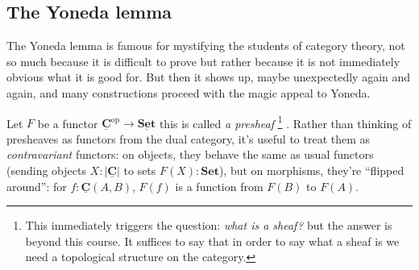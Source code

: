 \documentclass{article}
\newcommand{\Prop}{\mathbf{Prop}}
\newcommand{\Set}{\mathbf{Set}}
\newcommand{\cat}[1]{\underline{\mathbf{#1}}}
\newcommand{\obj}[1]{|#1|}
\newcommand{\op}{\mathrm{op}}
\newcommand{\Nat}{\mathbb{N}}
\begin{document}
\subsection{The Yoneda lemma}
\label{sec:yoneda-lemma}

The Yoneda lemma is famous for mystifying the students of category theory, not so much because it is difficult to prove but rather because it is not immediately obvious what it is good for. But then it shows up, maybe unexpectedly again and again, and many constructions proceed with the magic appeal to Yoneda. 


Let $F$ be a functor $\cat{C}^\op \to \cat{\Set}$ this is called \emph{a presheaf}%
\footnote{This immediately triggers the question: \emph{what is a sheaf?} but the answer is beyond this course. It suffices to say that in order to say what a sheaf is we need a topological structure on the category.}
.
Rather than thinking of presheaves as functors from the dual category, it's useful to
treat them as \emph{contravariant} functors: on objects, they behave the same as
usual functors (sending objects $X\colon\obj{\cat{C}}$ to sets $F(X)\colon\Set$),
but on morphisms, they're ``flipped around'': for $f\colon\cat{C}(A,B)$, $F(f)$
is a function from $F(B)$ to $F(A)$.
\end{document}
